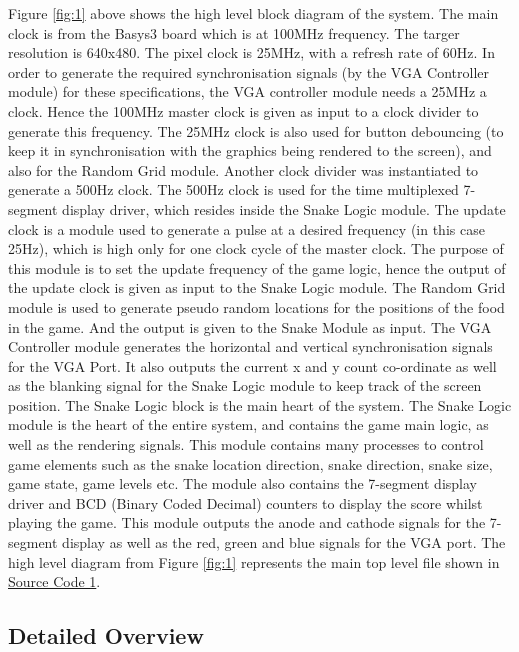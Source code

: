 \documentclass[aps, secnumarabic, balancelastpage, asmath, amssymb, nofootinbib, floatfix,]{revtex4-2}
\begin{document}
{Figure \ref{fig:1} above shows the high level block diagram of the system. The main clock is from the Basys3 board which is at 100MHz frequency. The targer resolution is 640x480. The pixel clock is 25MHz, with a refresh rate of 60Hz. In order to generate the required synchronisation signals (by the VGA Controller module) for these specifications, the VGA controller module needs a 25MHz a clock. Hence the 100MHz master clock is given as input to a clock divider to generate this frequency. The 25MHz clock is also used for button debouncing (to keep it in synchronisation with the graphics being rendered to the screen), and also for the Random Grid module. Another clock divider was instantiated to generate a 500Hz clock. The 500Hz clock is used for the time multiplexed 7-segment display driver, which resides inside the Snake Logic module. The update clock is a module used to generate a pulse at a desired frequency (in this case 25Hz), which is high only for one clock cycle of the master clock. The purpose of this module is to set the update frequency of the game logic, hence the output of the update clock is given as input to the Snake Logic module. The Random Grid module is used to generate pseudo random locations for the positions of the food in the game. And the output is given to the Snake Module as input. The VGA Controller module generates the horizontal and vertical synchronisation signals for the VGA Port. It also outputs the current x and y count co-ordinate as well as the blanking signal for the Snake Logic module to keep track of the screen position. The Snake Logic block is the main heart of the system. The Snake Logic module is the heart of the entire system, and contains the game main logic, as well as the rendering signals. This module contains many processes to control game elements such as the snake location direction, snake direction, snake size, game state, game levels etc. The module also contains the 7-segment display driver and BCD (Binary Coded Decimal) counters to display the score whilst playing the game. This module outputs the anode and cathode signals for the 7-segment display as well as the red, green and blue signals for the VGA port. The high level diagram from Figure \ref{fig:1} represents the main top level file shown in \hyperref[code:main]{Source Code 1}.

\vspace{-1.0em}
\subsection{\fontsize{11.4pt}{12pt}\selectfont \bf Detailed Overview \label{sec:2.2}}

}
\end{document}
